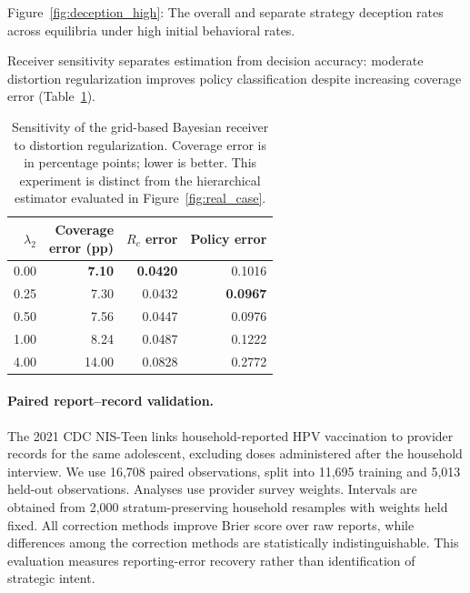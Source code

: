 \documentclass[sigconf,review]{acmart}
\begin{document}
Figure~\ref{fig:deception_high}: The overall and separate strategy deception rates across equilibria under high initial behavioral rates.


Receiver sensitivity separates estimation from decision accuracy: moderate distortion regularization improves policy classification despite increasing coverage error (Table~\ref{tab:receiver-sensitivity}).

\begin{table}[h]
\centering
\caption{Sensitivity of the grid-based Bayesian receiver to
distortion regularization. Coverage error is in percentage
points; lower is better. This experiment is distinct from
the hierarchical estimator evaluated in
Figure~\ref{fig:real_case}.}
\label{tab:receiver-sensitivity}
\small
\setlength{\tabcolsep}{4pt}
\begin{tabular}{@{}rrrr@{}}
\toprule
$\lambda_2$
& \shortstack{Coverage\\error (pp)}
& $R_c$ error
& Policy error \\
\midrule
0.00 & \textbf{7.10} & \textbf{0.0420} & 0.1016 \\
0.25 & 7.30          & 0.0432          & \textbf{0.0967} \\
0.50 & 7.56          & 0.0447          & 0.0976 \\
1.00 & 8.24          & 0.0487          & 0.1222 \\
4.00 & 14.00         & 0.0828          & 0.2772 \\
\bottomrule
\end{tabular}
\end{table}


\paragraph{Paired report--record validation.} The 2021 CDC NIS-Teen links household-reported HPV vaccination to provider records for the same adolescent, excluding doses administered after the household interview. We use 16,708 paired observations, split into 11,695 training and 5,013 held-out observations. Analyses use provider survey weights. Intervals are obtained from 2,000 stratum-preserving household resamples with weights held fixed. All correction methods improve Brier score over raw reports, while differences among the correction methods are statistically indistinguishable. This evaluation measures reporting-error recovery rather than identification of strategic intent.
\end{document}
